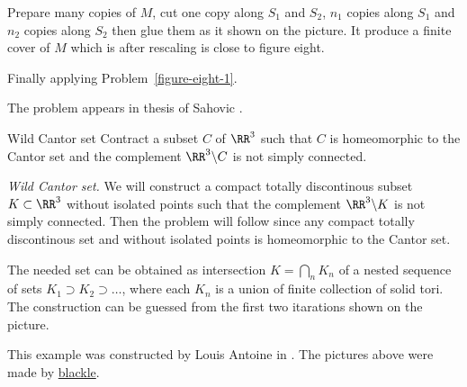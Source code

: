 Prepare many copies of $M$, cut one copy along $S_1$ and $S_2$,
$n_1$ copies along $S_1$ and $n_2$ copies along $S_2$
then glue them as it shown on the picture. 
It produce a finite cover of $M$ which is after rescaling is close to figure eight.

Finally applying Problem~\ref{figure-eight-1}.

 The problem appears in thesis of Sahovic \cite{sahovic}.



















\begin{pr}{}{Wild Cantor set}\label{Wild Cantor set} 
Contract a subset $C$ of $\RR^3$ 
such that $C$ is homeomorphic to the Cantor set and the complement $\RR^3\backslash C$ is not simply connected.
\end{pr}



\textit{Wild Cantor set.}
We will construct a compact totally discontinous subset $K\subset\RR^3$ without isolated points  
such that the complement $\RR^3\backslash K$ is not simply connected.
Then the problem will follow
since any compact totally discontinous set and without isolated points
is homeomorphic to the Cantor set.

The needed set can be obtained as intersection $K=\bigcap_n K_n$
of a nested sequence 
of sets $K_1\supset K_2\supset\dots$, where each $K_n$ is a union of finite collection of solid tori. 
The construction can be guessed from the first two itarations shown on the picture.

This example was constructed by Louis Antoine in \cite{antoine}.
The pictures above were made by \href{http://en.wikipedia.org/wiki/User:Blacklemon67}{blackle}.


























